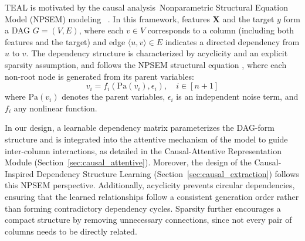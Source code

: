 \documentclass[conference]{IEEEtran}
\newcommand{\icde}[1]{{\color{black}#1}}
\newcommand{\zj}[1]{{\color{black}#1}}
\newcommand{\rln}[1]{{\color{black}#1}}
\newcommand{\sytwo}[1]{{\color{black}#1}}
\newcommand{\syend}[1]{{\color{black}#1}}
\newcommand{\syadd}[1]{{\color{black}#1}}
\newcommand{\vldb}[1]{{\color{black}#1}}
\newcommand{\zjic}[1]{{\color{black}#1}}
\newcommand{\syic}[1]{{\color{black}#1}}
\newcommand*{\ourmodel}{TEAL}
\begin{document}
\sytwo{\ourmodel{}} is \zj{motivated by} the \zjic{causal analysis}~\syic{Nonparametric Structural Equation Model (NPSEM) modeling 
}~\cite{r:pearl2009,r:peters2017}.
In this \syic{framework}, features $\mathbf{X}$ and the target $y$ form a DAG $G = (V, E)$, where each $v \in V$ corresponds to a column \sytwo{(including both features and the target)} and edge $\langle u, v \rangle \in E$ indicates a \syic{directed dependency from $u$ to $v$}. 
\syic{The dependency structure is characterized by acyclicity and an explicit sparsity assumption,}
\syic{and follows the NPSEM structural equation \cite{r:pearl2009}, where each non-root node is generated from its parent variables}:
\begin{equation}
    v_i = f_i(\mathrm{Pa}(v_i), \epsilon_i), \quad i \in [n+1]
    \label{eq:structural-eq}
\end{equation}
where $\mathrm{Pa}(v_i)$ denotes the \syic{parent variables}, $\epsilon_i$ is an \syic{independent noise} term, and $f_i$ any nonlinear function.

\rln{
In our design, \syic{a learnable dependency matrix parameterizes the DAG-form structure and is} \syic{integrated} into the attentive mechanism of the model to \syic{guide inter-column interactions}, \syend{as detailed }in \vldb{the Causal-Attentive Representation Module (Section~\ref{sec:causal_attentive}).}
Moreover, the design of the \syic{Causal-Inspired Dependency Structure Learning} (Section~\ref{sec:causal_extraction}) follows this NPSEM perspective.
\zjic{
Additionally, acyclicity prevents circular dependencies, ensuring that the learned relationships follow a consistent generation order rather than forming contradictory dependency cycles.
}
\zjic{
Sparsity further encourages a compact structure by removing unnecessary connections, since not every pair of columns needs to be directly related. 
}
}


\end{document}
